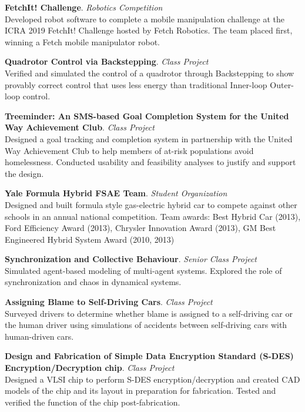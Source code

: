 \documentclass[letterpaper]{article}
\begin{document}
\begin{description}[leftmargin=7.5em, style=nextline]
  \item[ICRA 2019] \textbf{FetchIt! Challenge}. \textit{Robotics Competition} \\
  Developed robot software to complete a mobile manipulation challenge at the ICRA 2019 FetchIt! Challenge hosted by Fetch Robotics. The team placed first, winning a Fetch mobile manipulator robot.

  \item[Spring 2016] \textbf{Quadrotor Control via Backstepping}. \textit{Class Project} \\
  Verified and simulated the control of a quadrotor through Backstepping to show provably correct control that uses less energy than traditional Inner-loop Outer-loop control.

  \item[Spring 2016] \textbf{Treeminder: An SMS-based Goal Completion System for the United Way Achievement Club}. \textit{Class Project} \\
  Designed a goal tracking and completion system in partnership with the United Way Achievement Club to help members of at-risk populations avoid homelessness. Conducted usability and feasibility analyses to justify and support the design.

  \item[2009 --- 2013] \textbf{Yale Formula Hybrid FSAE Team}. \textit{Student Organization} \\
  Designed and built formula style gas-electric hybrid car to compete against other schools in an annual national competition. Team awards: Best Hybrid Car (2013), Ford Efficiency Award (2013), Chrysler Innovation Award (2013), GM Best Engineered Hybrid System Award (2010, 2013)

  \item[2012 --- 2013] \textbf{Synchronization and Collective Behaviour}. \textit{Senior Class Project} \\
  Simulated agent-based modeling of multi-agent systems. Explored the role of synchronization and chaos in dynamical systems.

  \item[Spring 2012] \textbf{Assigning Blame to Self-Driving Cars}. \textit{Class Project} \\
  Surveyed drivers to determine whether blame is assigned to a self-driving car or the human driver using simulations of accidents between self-driving cars with human-driven cars.

  \item[Fall 2011] \textbf{Design and Fabrication of Simple Data Encryption Standard (S-DES) Encryption/Decryption chip}. \textit{Class Project} \\
  Designed a VLSI chip to perform S-DES encryption/decryption and created CAD models of the chip and its layout in preparation for fabrication. Tested and verified the function of the chip post-fabrication.
\end{description}
\end{document}
